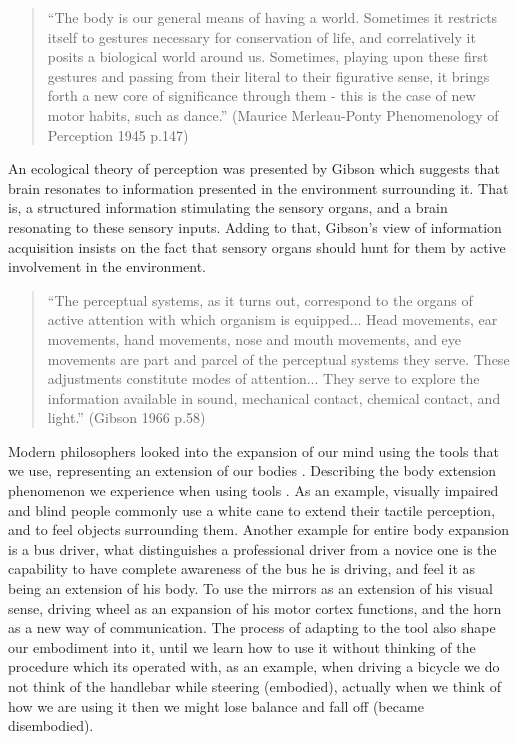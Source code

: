 
\begin{quote}
``The body is our general means of having a world. Sometimes it restricts itself to gestures necessary for conservation of life, and correlatively it posits a biological world around us. Sometimes, playing upon these first gestures and passing from their literal to their figurative sense, it brings forth a new core of significance through them - this is the case of new motor habits, such as dance.'' (Maurice Merleau-Ponty Phenomenology of Perception 1945 p.147)
\end{quote}

An ecological theory of perception was presented by Gibson \cite{gibson1966senses} which suggests that brain resonates to information presented in the environment surrounding it. That is, a structured information stimulating the sensory organs, and a brain resonating to these sensory inputs. Adding to that, Gibson's view of information acquisition insists on the fact that sensory organs should hunt for them by active involvement in the environment. 

\begin{quote}
``The perceptual systems, as it turns out, correspond to the organs of active attention with which organism is equipped... Head movements, ear movements, hand movements, nose and mouth movements, and eye movements are part and parcel of the perceptual systems they serve. These adjustments constitute modes of attention... They serve to explore the information available in sound, mechanical contact, chemical contact, and light.'' (Gibson 1966 p.58)
\end{quote}

Modern philosophers looked into the expansion of our mind using the tools that we use, representing an extension of our bodies \cite{shapiro2010embodied, malafouris2013things}. Describing the body extension phenomenon we experience when using tools . As an example, visually impaired and blind people commonly use a white cane to extend their tactile perception, and to feel objects surrounding them. Another example for entire body expansion is a bus driver, what distinguishes a professional driver from a novice one is the capability to have complete awareness of the bus he is driving, and feel it as being an extension of his body. To use the mirrors as an extension of his visual sense, driving wheel as an expansion of his motor cortex functions, and the horn as a new way of communication. The process of adapting to the tool also shape our embodiment into it, until we learn how to use it without thinking of the procedure which its operated with, as an example, when driving a bicycle  we do not think of the handlebar while steering (embodied), actually when we think of how we are using it then we might lose balance and fall off (became disembodied). 


